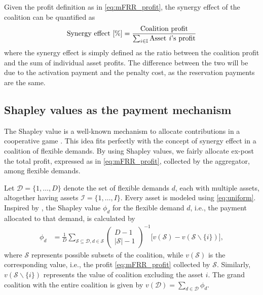 \documentclass[conference]{IEEEtran}
\begin{document}
Given the profit definition as in \eqref{eq:mFRR_profit}, the synergy effect of the coalition can be quantified as
%
\begin{align}\label{eq:synergy_effect}
    \text{Synergy effect [\%]} = \frac{ \text{Coalition profit} }{ \sum_{i \in \mathbb{I}} \text{Asset \textit{i}'s profit} }
\end{align}
where the synergy effect is simply defined as the ratio between the coalition profit and the sum of individual asset profits. The difference between the two will be due to the activation payment and the penalty cost, as the reservation payments are the same.

\subsection{Shapley values as the payment mechanism}
%
The Shapley value is a well-known mechanism to allocate contributions in a cooperative game \cite{shapley1997value}. This idea fits perfectly with the concept of synergy effect in a coalition of flexible demands. By using Shapley values, we fairly allocate ex-post the total profit, expressed as in \eqref{eq:mFRR_profit}, collected by the aggregator, among flexible demands.



Let $\mathcal{D}=\{1, \hdots, D \}$ denote the set of flexible demands $d$, each with multiple assets, altogether having assets $\mathcal{I}=\{1, \hdots, I \}$. Every asset is modeled using \eqref{eq:uniform}.
%
Inspired by \cite{shapley1997value}, the Shapley value $\phi_d$  for the flexible demand $d$, i.e., the payment allocated to that demand, is calculated by
%
\begin{align}\label{eq:shap}
    \phi_d & = \frac{1}{D} \sum_{\mathcal{S} \subseteq \mathcal{D}, d \in \mathcal{S}}\left(\begin{array}{c}
                                                                                                D-1 \\
                                                                                                |\mathcal{S}|-1
                                                                                            \end{array}\right)^{-1}\Big[v(\mathcal{S})-v(\mathcal{S} \backslash\{i\})\Big],
\end{align}
%
where $\mathcal{S}$ represents possible subsets of the coalition, while $v(\mathcal{S})$ is the corresponding value, i.e., the profit \eqref{eq:mFRR_profit} collected by $\mathcal{S}$. Similarly, $v(\mathcal{S} \backslash\{i\})$ represents the value of coalition excluding the asset $i$. The grand coalition with the entire coalition is given by $v(\mathcal{D}) = \sum_{d \in \mathcal{D}} \phi_{d}$.
\end{document}
